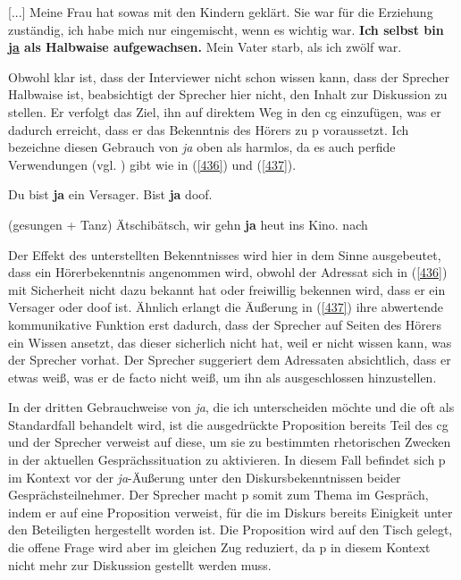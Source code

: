 \begin{exe}
	\ex\label{435} 
	\scriptsize
	[...] Meine Frau hat sowas mit den Kindern geklärt. Sie war für die Erziehung zuständig, ich habe mich nur eingemischt, wenn es wichtig war. \textbf{Ich selbst bin \underline{ja} als Halbwaise aufgewachsen.} Mein Vater starb, als ich zwölf war.   
	\hfill\hbox {\citet[204]{Rinas2006}}
\end{exe}
Obwohl klar ist, dass der Interviewer nicht schon wissen kann, dass der Sprecher Halbwaise ist, beabsichtigt der Sprecher hier nicht, den Inhalt zur Diskussion zu stellen. Er verfolgt das Ziel, ihn auf direktem Weg in den cg einzufügen, was er dadurch erreicht, dass er das Bekenntnis des Hörers zu p voraussetzt. Ich bezeichne diesen Gebrauch von \textit{ja} oben als \glqq harmlos\grqq{}, da es auch perfide Verwendungen (vgl. \citealt{Reiter1980}) gibt wie in (\ref{436}) und (\ref{437}).

\begin{exe}
	\ex\label{436} 
	\begin{xlist}
		\ex\label{436a} Du bist \textbf{ja} ein Versager.	
		\hfill\hbox {\citet[134]{Dahl1988}}	
 		\ex\label{436b}	Bist \textbf{ja} doof.		
 		\hfill\hbox {\citet[345]{Reiter1980}}		
 	\end{xlist}	
\end{exe}	

\begin{exe}
	\ex\label{437} 
(gesungen + Tanz) Ätschibätsch, wir gehn \textbf{ja} heut ins Kino.	
	\newline
 	\hbox{}\hfill\hbox {nach \citet[346]{Reiter1980}}		
\end{exe}	
Der Effekt des unterstellten Bekenntnisses wird hier in dem Sinne \glq ausgebeutet\grq {}, dass ein Hörerbekenntnis angenommen wird, obwohl der Adressat sich in (\ref{436}) mit Sicherheit nicht dazu bekannt hat oder freiwillig bekennen wird, dass er ein Versager oder doof ist. Ähnlich erlangt die Äußerung in (\ref{437}) ihre abwertende kommunikative Funktion erst dadurch, dass der Sprecher auf Seiten des Hörers ein Wissen ansetzt, das dieser sicherlich nicht hat, weil er nicht wissen kann, was der Sprecher vorhat. Der Sprecher suggeriert dem Adressaten absichtlich, dass er etwas weiß, was er de facto nicht weiß, um ihn als ausgeschlossen hinzustellen.

In der dritten Gebrauchweise von \textit{ja}, die ich unterscheiden möchte und die oft als Standardfall behandelt wird, ist die ausgedrückte Proposition bereits Teil des cg und der Sprecher verweist auf diese, um sie zu bestimmten rhetorischen Zwecken in der aktuellen Gesprächssituation zu aktivieren. In diesem Fall befindet sich p im Kontext vor der \textit{ja}-Äußerung unter den Diskursbekenntnissen beider Gesprächsteilnehmer. Der Sprecher macht p somit zum Thema im Gespräch, indem er auf eine Proposition verweist, für die im Diskurs bereits Einigkeit unter den Beteiligten hergestellt worden ist. Die Proposition wird auf den Tisch gelegt, die offene Frage wird aber im gleichen Zug reduziert, da p in diesem Kontext nicht mehr zur Diskussion gestellt werden muss.

